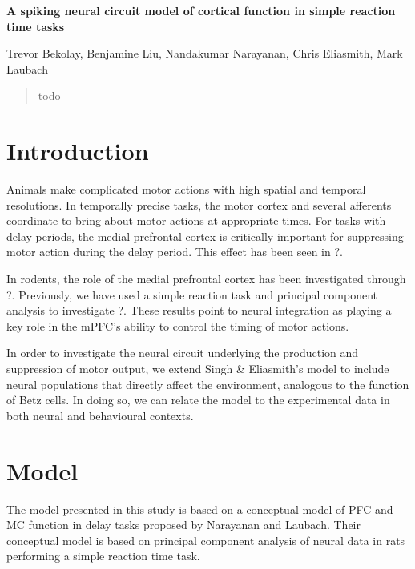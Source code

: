\documentclass[12pt]{article}
\title{}
\date{}
\author{}
\begin{document}
\begin{center} \begin{Large}
  \textbf{A spiking neural circuit model of cortical function
          in simple reaction time tasks}
\end{Large} \end{center}

\begin{center}
  Trevor Bekolay, Benjamine Liu, Nandakumar Narayanan, Chris
  Eliasmith, Mark Laubach
\end{center}

\begin{abstract}
  todo
\end{abstract}

\section{Introduction}

Animals make complicated motor actions
with high spatial and temporal resolutions.
In temporally precise tasks,
the motor cortex and several afferents coordinate
to bring about motor actions at appropriate times.
For tasks with delay periods,
the medial prefrontal cortex is critically important
for suppressing motor action during the delay period.
This effect has been seen in ?.  %

In rodents, the role of the medial prefrontal cortex
has been investigated through ?.
Previously, we have used a simple reaction task
and principal component analysis
to investigate ?. %
These results point to neural integration
as playing a key role
in the mPFC's ability
to control the timing of motor actions.

In order to investigate the neural circuit
underlying the production and suppression of motor output,
we extend Singh \& Eliasmith's model to include
neural populations that directly affect the environment,
analogous to the function of Betz cells.
In doing so, we can relate the model to the experimental data
in both neural and behavioural contexts.

\section{Model}

The model presented in this study
is based on a conceptual model of PFC and MC
function in delay tasks proposed by Narayanan and Laubach.
Their conceptual model is based on
principal component analysis of neural data
in rats performing a simple reaction time task.
\end{document}
